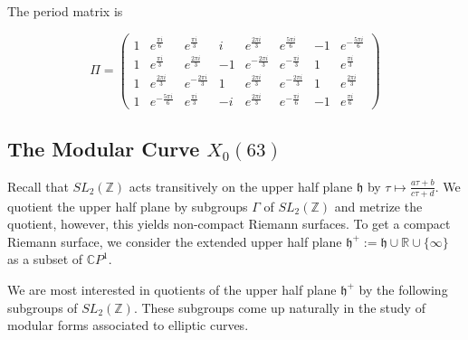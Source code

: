 \documentclass[12pt,reqno]{amsart}
\newcommand{\C}{\mathbb{C}}
\newcommand{\Z}{\mathbb{Z}}
\newcommand{\R}{\mathbb{R}}
\newtheorem*{thm*}{Theorem}
\theoremstyle{definition}
\theoremstyle{remark}
\begin{document}




The period matrix is

$$\Pi = \begin{pmatrix}
 1 & e^{\frac{\pi i}{6}} & e^{\frac{\pi i}{3}} & i & e^{\frac{2 \pi i}{3}} & e^{\frac{5 \pi i}{6}} & -1 & e^{-\frac{5 \pi i}{6}} \\
 1 & e^{\frac{\pi i}{3}} & e^{\frac{2 \pi i}{3}} & -1 & e^{-\frac{2 \pi i}{3}} & e^{-\frac{\pi i}{3}} & 1 & e^{\frac{\pi i}{3}} \\
 1 & e^{\frac{2 \pi i}{3}} & e^{-\frac{2 \pi i}{3}} & 1 & e^{\frac{2 \pi i}{3}} & e^{-\frac{2 \pi i}{3}} & 1 & e^{\frac{2 \pi i}{3}} \\
 1 & e^{-\frac{5 \pi i}{6}} & e^{\frac{\pi i}{3}} & -i & e^{\frac{2 \pi i}{3}} & e^{-\frac{\pi i}{6}} & -1 & e^{\frac{\pi i}{6}} 
\end{pmatrix}$$
\newpage
 
\subsection{The Modular Curve $X_0(63)$}
\label{sec:modular}
Recall that $SL_2(\Z)$ acts transitively on the upper half plane $\mathfrak{h}$ by $\tau \mapsto \frac{a\tau + b}{c\tau + d}$. We quotient the upper half plane by subgroups $\Gamma$ of $SL_2(\Z)$ and metrize the quotient, however, this yields non-compact Riemann surfaces. To get a compact Riemann surface, we consider the extended upper half plane $\mathfrak{h}^{+} := \mathfrak{h} \cup \R \cup \{ \infty \}$ as a subset of $\C P^1$.  

We are most interested in quotients of the upper half plane $\mathfrak{h}^{+}$ by the following subgroups of $SL_2(\Z)$. These subgroups come up naturally in the study of modular forms associated to elliptic curves.
\end{document}
